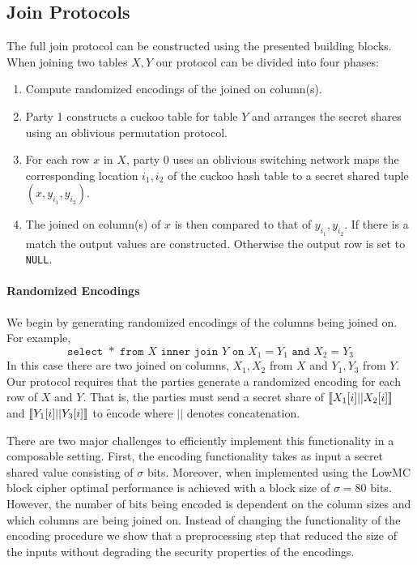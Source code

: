 \subsection{Join Protocols}\label{sec:join}

The full join protocol can be constructed using the presented building blocks. When joining two tables $X,Y$ our protocol can be divided into four phases:

\begin{enumerate}
	\item Compute randomized encodings of the joined on column(s). 
	\item Party 1 constructs a cuckoo table for table $Y$ and arranges the secret shares using an oblivious permutation protocol. 
	\item For each row $x$ in $X$, party 0 uses an oblivious switching network maps the corresponding location $i_1,i_2$ of the cuckoo hash table to a secret shared tuple $(x, y_{i_1}, y_{i_2})$.
	\item The joined on column(s) of $x$ is then compared to that of $y_{i_1}, y_{i_2}$. If there is a match the output values are constructed. Otherwise the output row is set to \texttt{NULL}.
\end{enumerate} 

\paragraph{Randomized Encodings}
We begin by generating randomized encodings of the columns being joined on. For example, 
$$
	\texttt{select }* \texttt{ from } X \texttt{ inner join } Y \texttt{ on } X_1 = Y_1 \texttt{ and } X_2 = Y_3
$$
In this case there are two joined on columns, $X_1,X_2$ from $X$ and $Y_1,Y_3$ from $Y$. Our protocol requires that the parties generate a randomized encoding for each row of $X$ and $Y$. That is, the parties must send a secret share of $\llbracket X_1[i] || X_2[i]\rrbracket$ and $\llbracket Y_1[i] || Y_3[i]\rrbracket$ to \f{encode} where $||$ denotes concatenation. 

There are two major challenges to efficiently implement this functionality in a composable setting. First, the encoding functionality takes as input a secret shared value consisting of $\sigma$ bits. Moreover, when implemented using the LowMC block cipher optimal performance is achieved with a block size of $\sigma=80$ bits. However, the number of bits being encoded is dependent on the column sizes and which columns are being joined on. Instead of changing the functionality of the encoding procedure we show that a preprocessing step that reduced the size of the inputs without degrading the security properties of the encodings. 

